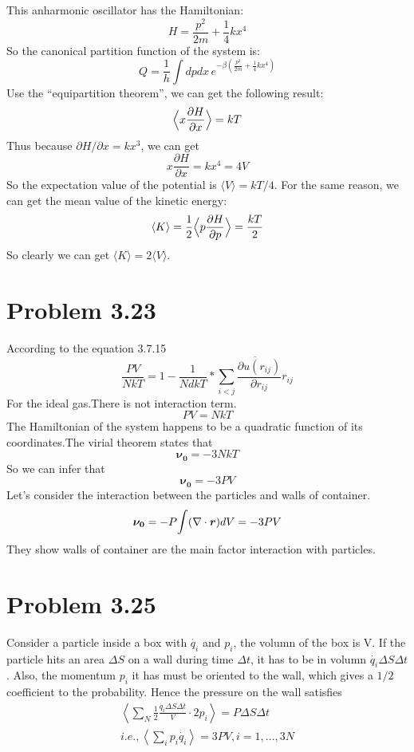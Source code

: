 \documentclass{article}
\begin{document}
	This anharmonic oscillator has the Hamiltonian:
	$$
	H = \frac{p^2}{2m} + \frac{1}{4}kx^4
	$$
	So the canonical partition function of the system is:
	\begin{equation}
	Q = \frac{1}{h}\int dpdx\,e^{-\beta\left(\frac{p^2}{2m} + \frac{1}{4}kx^4\right) }
	\end{equation}
	Use the ``equipartition theorem'', we can get the following result:
	\begin{equation}
	\Big{\langle} x \frac{\partial H}{\partial x}\Big{\rangle} =kT
	\end{equation}
	Thus because $\partial H/\partial x = kx^3$, we can get
	$$
	x\frac{\partial H}{\partial x} = kx^4 = 4V
	$$
	So the expectation value of the potential is $\langle V\rangle = kT/4$. For the same reason, we can get the mean value of the kinetic energy:
	\begin{equation}
	\langle K\rangle = \frac{1}{2}\Big{\langle} p\frac{\partial H}{\partial p}\Big{\rangle} = \frac{kT}{2}
	\end{equation}
	So clearly we can get $\langle K\rangle = 2\langle V\rangle$.
	

\section*{Problem 3.23} %
\label{sec:problem_3_23}
	According to the equation 3.7.15
	$$
	\frac{PV}{NkT}=1-\frac{1}{NdkT}*\overline{\sum_{i<j}\frac{\partial{u(r_{ij})}}{\partial{r_{ij}}}r_{ij}}
	$$
	For the ideal gas.There is not interaction term.
	$$
	PV=NkT
	$$
	The Hamiltonian of the system happens to be a quadratic function of its coordinates.The virial theorem states that
	$$
	\boldsymbol{\nu_0}=-3NkT
	$$
	So we can infer that
	$$
	\boldsymbol{\nu_0}=-3PV
	$$
	Let's consider the interaction between the particles and walls of container. 
	$$
	\boldsymbol{\nu_0}=-P\mathlarger{\int}(\nabla\cdot\boldsymbol{ r})dV=-3PV
	$$
	They show walls of container are the main factor interaction with particles.


\section*{Problem 3.25} %
\label{sec:problem_3_25}
	Consider a particle inside a box with $\dot{q_i} $ and $p_i$, the volumn of the box is V. If the particle hits an area $\Delta S $ on a wall during time $\Delta t $, it has to be in volumn $\dot{q_i} \Delta S \Delta t $. Also, the momentum $p_i$ it has must be oriented to the wall, which gives a $1/2$ coefficient to the probability. Hence the pressure on the wall satisfies
	\begin{gather*}
		\left<\sum_N \frac{1}{2} \frac{\dot{q_i} \Delta S \Delta t }{V} \cdot 2p_i \right> = P \Delta S \Delta t\\
		i.e., \left<\sum_i p_i \dot{q_i} \right> = 3PV, i=1,...,3N
	\end{gather*}
\end{document}
